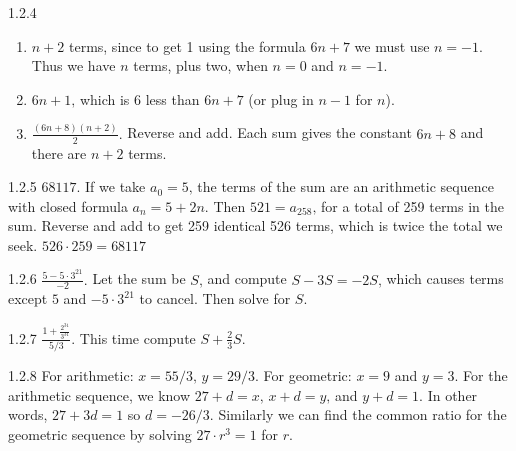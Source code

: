 \documentclass[11pt,]{book}
\theoremstyle{ptxplainnotitle}
\theoremstyle{ptxplaintitle}
\theoremstyle{ptxdefinitionnotitle}
\theoremstyle{ptxdefinitiontitle}
\theoremstyle{ptxdefinitionnotitle}
\theoremstyle{ptxdefinitiontitle}
\theoremstyle{ptxdefinitionnotitle}
\theoremstyle{ptxdefinitiontitle}
\theoremstyle{ptxdefinitiontitlenonumber}
\theoremstyle{ptxdefinitiontitlenonumber}
\numberwithin{equation}{chapter}
\begin{document}
\begin{divisionexercise}{1.2.4}
\textbf{}\hypertarget{p-279}{}%
\leavevmode%
\begin{enumerate}[label=(\alph*)]
\item\hypertarget{li-161}{}\hypertarget{p-280}{}%
\(n+2\) terms, since to get 1 using the formula \(6n+7\) we must use \(n=-1\text{.}\)  Thus we have \(n\) terms, plus two, when \(n=0\) and \(n=-1\text{.}\)%
\item\hypertarget{li-162}{}\hypertarget{p-281}{}%
\(6n+1\text{,}\) which is 6 less than \(6n+7\) (or plug in \(n-1\) for \(n\)).%
\item\hypertarget{li-163}{}\hypertarget{p-282}{}%
\(\frac{(6n+8)(n+2)}{2}\text{.}\)  Reverse and add.  Each sum gives the constant \(6n+8\) and there are \(n+2\) terms.%
\end{enumerate}
%
\end{divisionexercise}%
\begin{divisionexercise}{1.2.5}
\textbf{}\hypertarget{p-288}{}%
\(68117\text{.}\)  If we take \(a_0 = 5\text{,}\) the terms of the sum are an arithmetic sequence with closed formula \(a_n = 5+2n\text{.}\)  Then \(521 = a_{258}\text{,}\) for a total of 259 terms in the sum.  Reverse and add to get 259 identical 526 terms, which is twice the total we seek.  \(526\cdot 259 = 68117\)%
\end{divisionexercise}%
\begin{divisionexercise}{1.2.6}
\textbf{}\hypertarget{p-294}{}%
\(\frac{5-5\cdot 3^{21}}{-2}\text{.}\)  Let the sum be \(S\text{,}\) and compute \(S - 3S = -2S\text{,}\) which causes terms except \(5\) and \(-5\cdot 3^{21}\) to cancel.  Then solve for \(S\text{.}\)%
\end{divisionexercise}%
\begin{divisionexercise}{1.2.7}
\textbf{}\hypertarget{p-300}{}%
\(\frac{1 + \frac{2^{31}}{3^{31}}}{5/3}\text{.}\)  This time compute \(S + \frac{2}{3}S\text{.}\)%
\end{divisionexercise}%
\begin{divisionexercise}{1.2.8}
\textbf{}\hypertarget{p-308}{}%
For arithmetic: \(x = 55/3\text{,}\) \(y = 29/3\text{.}\) For geometric: \(x = 9\) and \(y = 3\text{.}\)  For the arithmetic sequence, we know \(27 + d = x\text{,}\) \(x + d = y\text{,}\) and \(y + d = 1\text{.}\)  In other words, \(27 + 3d = 1\) so \(d = -26/3\text{.}\)  Similarly we can find the common ratio for the geometric sequence by solving \(27\cdot r^3 = 1\) for \(r\text{.}\)%
\end{divisionexercise}%
\end{document}
